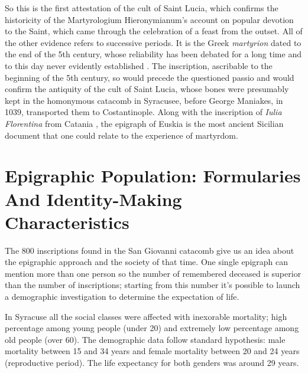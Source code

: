 \documentclass[amsthm,ebook]{saparticle}
\begin{document}
So this is the first attestation of the cult of Saint Lucia, which confirms the historicity of the Martyrologium Hieronymianum’s account on popular devotion to the Saint, which came through the celebration of a feast from the outset. All of the other evidence refers to successive periods. It is the Greek \emph{martyrion} dated to the end of the 5th century, whose reliability has been debated for a long time and to this day never evidently established \citep[95-135]{MILAZZORIZZONERVO1988}. The inscription, ascribable to the beginning of the 5th century, so would precede the questioned passio and would confirm the antiquity of the cult of Saint Lucia, whose bones were presumably kept in the homonymous catacomb in Syracusee, before George Maniakes, in 1039, transported them to Costantinople. Along with
the inscription of \emph{Iulia Florentina} from Catania \citep[608-610]{RIZZA1964}, the epigraph of Euskia is the most ancient Sicilian document that one could relate to the experience of martyrdom.

\section{Epigraphic Population: Formularies And Identity-Making Characteristics}

The 800 inscriptions found in the San Giovanni catacomb give us an idea about the epigraphic approach and the society of that time. One single epigraph can mention more than one person so the number of remembered deceased is superior than the number of inscriptions; starting from this number it’s possible to launch a demographic investigation to determine the expectation of life.

In Syracuse all the social classes were affected with inexorable mortality; high percentage among young people (under 20) and extremely low percentage among old people (over 60). The demographic data follow standard hypothesis: male mortality between 15 and 34 years and female mortality between 20 and 24 years (reproductive period). The life expectancy for both genders was around 29 years.
\end{document}
